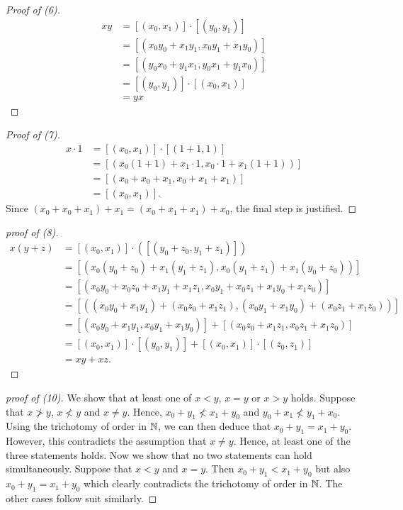 \begin{proof}[Proof of (6)]
    \begin{align*}
        xy &= [(x_0, x_1)] \cdot [(y_0, y_1)]\\
        &= [(x_0y_0 + x_1 y_1 , x_0y_1 + x_1 y_0)]\\
        &= [(y_0x_0 + y_1 x_1, y_0x_1 + y_1x_0)]\\
        &= [(y_0, y_1)] \cdot [(x_0, x_1)]\\
        &= yx
    \end{align*}
\end{proof}
\begin{proof}[Proof of (7)]
    \begin{align*}
        x \cdot 1 &= [(x_0, x_1)] \cdot [(1+1, 1)]\\
        &= [(x_0(1+1) + x_1 \cdot 1, x_0 \cdot 1 + x_1(1+1))] \\
        &= [(x_0 + x_0 + x_1, x_0 + x_1 + x_1)] \\
        &= [(x_0, x_1)].
    \end{align*}
    Since \((x_0+x_0+x_1) + x_1 = (x_0 +x_1 + x_1)+x_0\), the final step is justified.
\end{proof}
\begin{proof}[proof of (8)]
    \begin{align*}
        x(y+z) &= [(x_0, x_1)] \cdot ([(y_0+ z_0, y_1 + z_1)])\\
        &= [(x_0(y_0 + z_0) + x_1(y_1 + z_1), x_0(y_1 + z_1) + x_1(y_0 + z_0))]\\
        &= [(x_0y_0 + x_0z_0 + x_1 y_1 + x_1 z_1, x_0 y_1 + x_0 z_1 + x_1 y_0 + x_1 z_0)]\\
        &= [((x_0y_0 + x_1 y_1) + (x_0 z_0 + x_1 z_1), (x_0 y_1 + x_1 y_0) + (x_0 z_1 + x_1 z_0))] \\
        &= [(x_0 y_0 + x_1 y_1, x_0 y_1 + x_1 y_0)] + [(x_0 z_0 + x_1 z_1, x_0 z_1 + x_1 z_0)] \\
        &= [(x_0, x_1)] \cdot [(y_0, y_1)] + [(x_0, x_1)] \cdot [(z_0, z_1)] \\
        &= xy + xz.
    \end{align*}
\end{proof}
\begin{proof}[proof of (10)]
    We show that at least one of \(x < y\), \(x = y\) or \(x > y\) holds. Suppose that \(x \ngtr y\), \(x \nless y\) and \(x \neq y\).
    Hence, \(x_0 + y_1 \nless x_1 + y_0\) and \(y_0 + x_1 \nless y_1 + x_0\). Using the trichotomy of order in \(\mathbb{N}\), we can then deduce that \(x_0 + y_1 = x_1 + y_0\).
    However, this contradicts the assumption that \(x \neq y\). Hence, at least one of the three statements holds. Now we show that no two statements can hold simultaneously.
    Suppose that \(x < y\) and \(x = y\). Then \(x_0 + y_1 < x_1 + y_0\) but also \(x_0 + y_1 = x_1 + y_0\) which clearly contradicts the trichotomy of order in \(\mathbb{N}\). The other cases follow suit similarly.
\end{proof}
